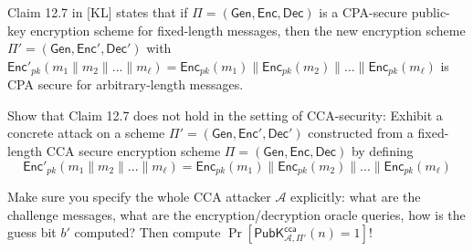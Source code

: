 \documentclass[a4paper,10pt,landscape,twocolumn]{scrartcl}
\begin{document}
	
\begin{exercise}
Claim 12.7 in [KL] states that if $\Pi=(\mathsf{Gen},\mathsf{Enc}, \mathsf{Dec})$ is a CPA-secure public-key encryption scheme for fixed-length messages, then the new encryption scheme $\Pi'=(\mathsf{Gen},\mathsf{Enc}', \mathsf{Dec}')$ with  $\mathsf{Enc}'_{pk}(m_1\|m_2\|...\|m_\ell)=\mathsf{Enc}_{pk}(m_1)\|\mathsf{Enc}_{pk}(m_2)\|...\|\mathsf{Enc}_{pk}(m_\ell)$ is CPA secure for arbitrary-length messages.

	Show that Claim 12.7 does not hold in the setting of CCA-security: Exhibit a concrete attack on a scheme $\Pi'=(\mathsf{Gen},\mathsf{Enc}', \mathsf{Dec}')$ constructed from a fixed-length CCA secure encryption scheme $\Pi=(\mathsf{Gen},\mathsf{Enc}, \mathsf{Dec})$ by defining 
\[
  \mathsf{Enc}'_{pk}(m_1\|m_2\|...\|m_\ell)=\mathsf{Enc}_{pk}(m_1)\|\mathsf{Enc}_{pk}(m_2)\|...\|\mathsf{Enc}_{pk}(m_\ell) \]

Make sure you specify the whole CCA attacker $\mathcal{A}$ explicitly: what are the
challenge messages, what are the encryption/decryption oracle queries,
how is the guess bit $b'$ computed? Then compute
$\Pr[\mathsf{PubK}^{\mathsf{cca}}_{\mathcal{A}, \Pi'}(n)=1]$!
\end{exercise}

\enlargethispage{1cm}


\newpage
\end{document}

